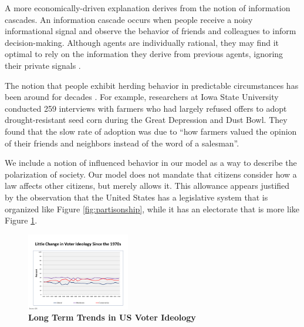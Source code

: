 

A more economically-driven explanation derives from the notion of information cascades. An information cascade occurs when people receive a noisy informational signal and observe the behavior of friends and colleagues to inform decision-making.  Although agents are individually rational, they may find it optimal to rely on the information they derive from previous agents, ignoring their private signals \cite{bikhchandani1992theory}.

The notion that people exhibit herding behavior in predictable circumstances has been around for decades \cite{shiller1995conversation}.  For example, researchers at Iowa State University conducted 259 interviews with farmers who had largely refused offers to adopt drought-resistant seed corn during the Great Depression and Dust Bowl.  They found that the slow rate of adoption was due to ``how farmers valued the opinion of their friends and neighbors instead of the word of a salesman''\cite{beal1957diffusion}.


We include a notion of influenced behavior in our model as a way to describe the polarization of society.  Our model does not mandate that citizens consider how a law affects other citizens, but merely allows it.  This allowance appears justified by the observation that the United States has a legislative system that is organized like Figure \ref{fig:partisonship}, while it has an electorate that is more like Figure \ref{fig:voters}.





\begin{figure}[htbp]
\begin{center}
\includegraphics[width=0.4\textwidth]{figs/polarization2}
\caption{{\bf Long Term Trends in US Voter Ideology}}
\label{fig:voters}
\end{center}
\end{figure}





